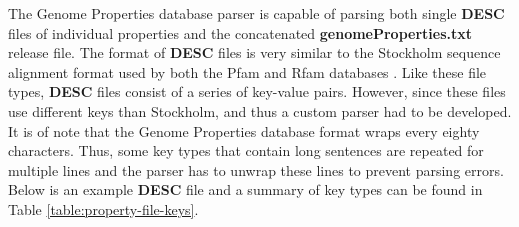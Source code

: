 The Genome Properties database parser is capable of parsing both single \textbf{DESC} files of individual properties and the concatenated \textbf{genomeProperties.txt} release file. The format of \textbf{DESC} files is very similar to the Stockholm sequence alignment format used by both the Pfam and Rfam databases \cite{bateman2004pfam, griffiths2003rfam}. Like these file types, \textbf{DESC} files consist of a series of key-value pairs. However, since these files use different keys than Stockholm, and thus a custom parser had to be developed. It is of note that the Genome Properties database format wraps every eighty characters. Thus, some key types that contain long sentences are repeated for multiple lines and the parser has to unwrap these lines to prevent parsing errors. Below is an example \textbf{DESC} file and a summary of key types can be found in Table \ref{table:property-file-keys}.

